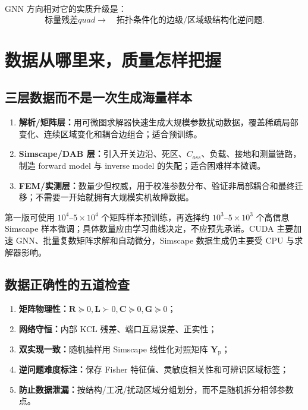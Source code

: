 \documentclass[UTF8,11pt,a4paper]{ctexart}
\newcommand{\Yp}{\bm Y_{\mathrm p}}
\newcommand{\RR}{\bm R}
\newcommand{\LL}{\bm L}
\newcommand{\CC}{\bm C}
\newcommand{\GG}{\bm G}
\begin{document}
GNN 方向相对它的实质升级是：
\begin{equation}
\text{标量残差}quad\longrightarrow\quad
\text{拓扑条件化的边级/区域级结构化逆问题}.
\end{equation}

\section{数据从哪里来，质量怎样把握}

\subsection{三层数据而不是一次生成海量样本}

\begin{enumerate}
\item \textbf{解析/矩阵层：}用可微图求解器快速生成大规模参数扰动数据，覆盖稀疏局部变化、连续区域变化和耦合边组合；适合预训练。
\item \textbf{Simscape/DAB 层：}引入开关边沿、死区、$C_{oss}$、负载、接地和测量链路，制造 forward model 与 inverse model 的失配；适合困难样本微调。
\item \textbf{FEM/实测层：}数量少但权威，用于校准参数分布、验证非局部耦合和最终迁移；不需要一开始就拥有大规模实机故障数据。
\end{enumerate}

第一版可使用 $10^4$--$5\times10^4$ 个矩阵样本预训练，再选择约 $10^3$--$5\times10^3$ 个高信息 Simscape 样本微调；具体数量应由学习曲线决定，不应预先承诺。CUDA 主要加速 GNN、批量复数矩阵求解和自动微分，Simscape 数据生成仍主要受 CPU 与求解器影响。

\subsection{数据正确性的五道检查}

\begin{enumerate}
\item \textbf{矩阵物理性：}$\RR\succeq0,\LL\succ0,\CC\succeq0,\GG\succeq0$；
\item \textbf{网络守恒：}内部 KCL 残差、端口互易误差、正实性；
\item \textbf{双实现一致：}随机抽样用 Simscape 线性化对照矩阵 $\Yp$；
\item \textbf{逆问题难度标注：}保存 Fisher 特征值、灵敏度相关性和可辨识区域标签；
\item \textbf{防止数据泄漏：}按结构/工况/扰动区域分组划分，而不是随机拆分相邻参数点。
\end{enumerate}
\end{document}
